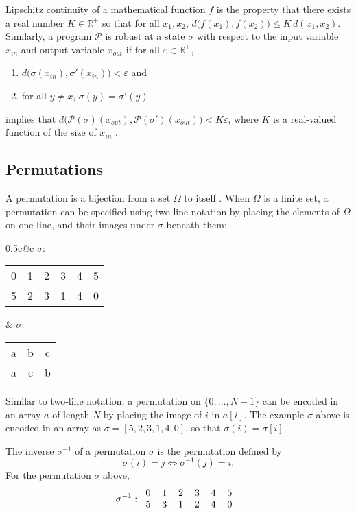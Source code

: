 \documentclass{llncs}
\begin{document}
Lipschitz continuity of a mathematical function \(f\) is the property that there exists a real number \(K \in \mathbb{R}^{+}\) so that for all \(x_{1}, x_{2}\), \(d\big(f(x_{1}), f(x_{2})\big) \leq K\,d(x_{1}, x_{2})\).  Similarly, a program \(\mathcal{P}\) is robust at a state \(\sigma\)  with respect to the input variable \(x_{in}\) and output variable \(x_{out}\) if for all \(\varepsilon \in \mathbb{R}^{+}\),
\begin{enumerate}
    \item \(d\big(\sigma(x_{in}), \sigma'(x_{in})\big) < \varepsilon\) and
    \item for all \(y \not= x\), \(\sigma(y) = \sigma'(y)\)
\end{enumerate}
implies that \(d\big(\mathcal{P}(\sigma)(x_{out}), \mathcal{P}(\sigma')(x_{out})\big) < K\varepsilon\), where \(K\) is a real-valued function of the size of \(x_{in}\) \cite{chaudhuri11}.

\subsection{Permutations}
\label{perms}

A permutation is a bijection from a set \(\Omega\) to itself \cite{dummitfoote}.  When \(\Omega\) is a finite set, a permutation can be specified using two-line notation by placing the elements of \(\Omega\) on one line, and their images under \(\sigma\) beneath them:

\begin{center}
\begin{tabular*}{0.5\textwidth}{c@{\extracolsep{\fill}}c}
\(\sigma\):
\begin{tabular}{cccccc}
0 & 1 & 2 & 3 & 4 & 5\\
5 & 2 & 3 & 1 & 4 & 0
\end{tabular}
&
\(\sigma\):
\begin{tabular}{ccc}
a & b & c\\
a & c & b
\end{tabular}
\end{tabular*}
\end{center}

Similar to two-line notation, a permutation on \(\{0, \dotsc, N-1\}\) can be encoded in an array \(a\) of length \(N\) by placing the image of \(i\) in \(a[i]\).  The example \(\sigma\) above is encoded in an array as \(\sigma = [5, 2, 3, 1, 4, 0]\), so that \(\sigma(i) = \sigma[i]\).

The inverse \(\sigma^{-1}\) of a permutation \(\sigma\) is the permutation defined by
\[\sigma(i) = j \Longleftrightarrow \sigma^{-1}(j) = i.\]
For the permutation \(\sigma\) above,
\[\sigma^{-1}:\begin{tabular}{cccccc}
0 & 1 & 2 & 3 & 4 & 5\\
5 & 3 & 1 & 2 & 4 & 0
\end{tabular}.\]
\end{document}
